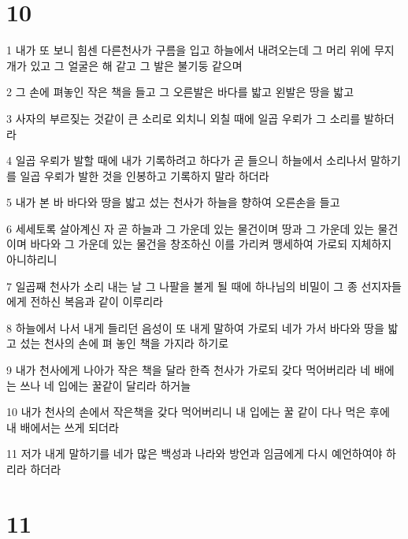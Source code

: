 \chapter{10}

\par 1 내가 또 보니 힘센 다른천사가 구름을 입고 하늘에서 내려오는데 그 머리 위에 무지개가 있고 그 얼굴은 해 같고 그 발은 불기둥 같으며
\par 2 그 손에 펴놓인 작은 책을 들고 그 오른발은 바다를 밟고 왼발은 땅을 밟고
\par 3 사자의 부르짖는 것같이 큰 소리로 외치니 외칠 때에 일곱 우뢰가 그 소리를 발하더라
\par 4 일곱 우뢰가 발할 때에 내가 기록하려고 하다가 곧 들으니 하늘에서 소리나서 말하기를 일곱 우뢰가 발한 것을 인봉하고 기록하지 말라 하더라
\par 5 내가 본 바 바다와 땅을 밟고 섰는 천사가 하늘을 향하여 오른손을 들고
\par 6 세세토록 살아계신 자 곧 하늘과 그 가운데 있는 물건이며 땅과 그 가운데 있는 물건이며 바다와 그 가운데 있는 물건을 창조하신 이를 가리켜 맹세하여 가로되 지체하지 아니하리니
\par 7 일곱째 천사가 소리 내는 날 그 나팔을 불게 될 때에 하나님의 비밀이 그 종 선지자들에게 전하신 복음과 같이 이루리라
\par 8 하늘에서 나서 내게 들리던 음성이 또 내게 말하여 가로되 네가 가서 바다와 땅을 밟고 섰는 천사의 손에 펴 놓인 책을 가지라 하기로
\par 9 내가 천사에게 나아가 작은 책을 달라 한즉 천사가 가로되 갖다 먹어버리라 네 배에는 쓰나 네 입에는 꿀같이 달리라 하거늘
\par 10 내가 천사의 손에서 작은책을 갖다 먹어버리니 내 입에는 꿀 같이 다나 먹은 후에 내 배에서는 쓰게 되더라
\par 11 저가 내게 말하기를 네가 많은 백성과 나라와 방언과 임금에게 다시 예언하여야 하리라 하더라

\chapter{11}

